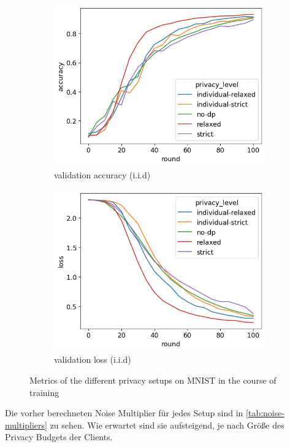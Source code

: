 \begin{figure}[h]
\begin{subfigure}{0.45\textwidth}
		\includegraphics[width=\textwidth]{Bilder/emnist-accuracy-iid.png}
		\caption{validation accuracy (i.i.d)}
	\end{subfigure}
	\begin{subfigure}{0.45\textwidth}
		\centering
		\includegraphics[width=\textwidth]{Bilder/emnist-loss-iid.png}
		\caption{validation loss (i.i.d)}
	\end{subfigure}
	\caption{Metrics of the different privacy setups on MNIST in the course of training}
	\label{fig:fed-emnist-results}
\end{figure}

Die vorher berechneten Noise Multiplier für jedes Setup sind in \autoref{tab:noise-multipliers} zu sehen. Wie erwartet sind sie aufsteigend, je nach Größe des Privacy Budgets der Clients.

